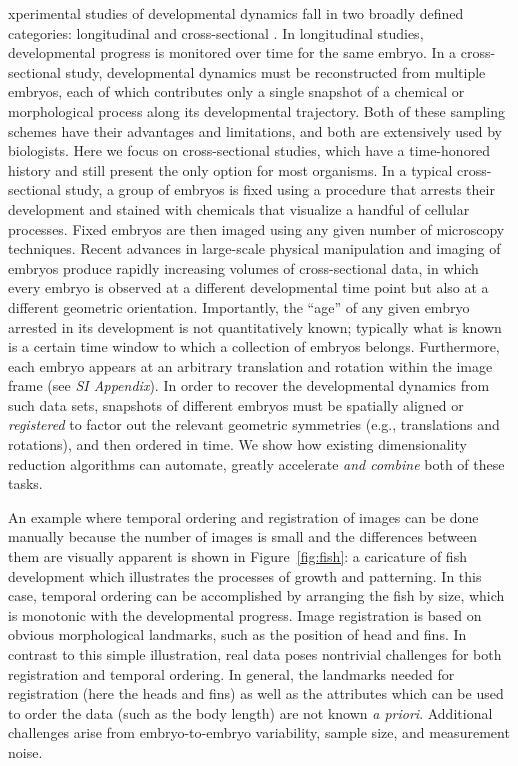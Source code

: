 \documentclass{pnastwo}
\begin{document}
\begin{article}
xperimental studies of developmental dynamics fall in two broadly defined categories: longitudinal and cross-sectional \cite{diggle2002analysis}.
%
In longitudinal studies, developmental progress is monitored over time for the same embryo.
%
In a cross-sectional study, developmental dynamics must be reconstructed from multiple embryos, each of which contributes only a single snapshot of a chemical or morphological process along its developmental trajectory.
%
Both of these sampling schemes have their advantages and limitations, and both are extensively used by biologists.
%
Here we focus on cross-sectional studies, which have a time-honored history and still present the only option for most organisms.
%
In a typical cross-sectional study, a group of embryos is fixed using a procedure that arrests their development and stained with chemicals that visualize a handful of cellular processes.
%
Fixed embryos are then imaged using any given number of microscopy techniques.
%
Recent advances in large-scale 
physical manipulation and imaging of embryos produce rapidly increasing volumes of cross-sectional data, in which every embryo is observed at a different developmental time point but also at a different geometric orientation.  
%
Importantly, the ``age'' of any given embryo arrested in its development is not quantitatively known; typically what is known is 
a certain time window to which a collection of embryos belongs.
%
Furthermore, each embryo appears at an arbitrary translation and rotation within the image frame (see {\it SI Appendix}). 
%
In order to recover the developmental dynamics from such data sets, snapshots of different embryos must be spatially aligned or {\em registered} to factor out the relevant geometric symmetries (e.g., translations and rotations), and then ordered in time.
%
We show how existing dimensionality reduction algorithms can automate, greatly accelerate {\it and combine} both of these tasks.

An example where 
temporal ordering and registration of images can be done manually
because the number of images is small and the differences between them are visually apparent is shown
in Figure~\ref{fig:fish}: a caricature of fish development which illustrates the processes of growth and patterning.
%
In this case, temporal ordering can be accomplished by arranging the fish by size, which is monotonic with the developmental progress.
%
Image registration is based on obvious morphological landmarks, such as the position of head and fins.
%
In contrast to this simple illustration, real data poses nontrivial challenges for both registration and temporal ordering.
%
In general, the landmarks needed for registration (here the heads and fins) as well as the attributes which can be used to order the data (such as the body length) are not known {\it a priori}.
%
Additional challenges arise from embryo-to-embryo variability, sample size, and measurement noise.


\end{article}
\end{document}
